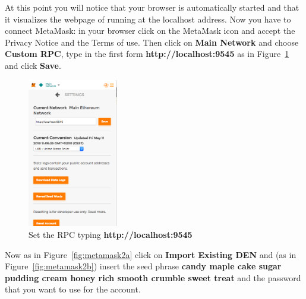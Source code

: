 At this point you will notice that your browser is automatically started and that it visualizes the webpage of \ProjectName{} running at the localhost address. Now you have to connect MetaMask: in your browser click on the MetaMask icon and accept the Privacy Notice and the Terms of use. Then click on \textbf{Main Network} and choose \textbf{Custom RPC}, type in the first form \textbf{http://localhost:9545} as in Figure~\ref{fig:metamask1} and click \textbf{Save}.
\begin{figure}[H]
	\centering
	\includegraphics[width=0.35\textwidth]{img/settings.png}
	\caption{Set the RPC typing \textbf{http://localhost:9545}}
	\label{fig:metamask1}
\end{figure}

Now as in Figure~\ref{fig:metamask2a}  click on \textbf{Import Existing DEN} and (as in Figure~\ref{fig:metamask2b}) insert the seed phrase \textbf{candy maple cake sugar pudding cream honey rich smooth crumble sweet treat} and the password that you want to use for the account.

